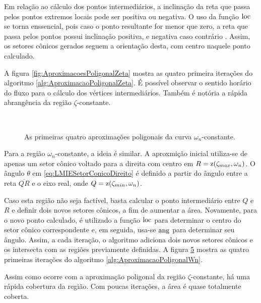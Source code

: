 Em relação ao cálculo dos pontos intermediários, a inclinação da reta que passa pelos pontos extremos locais pode ser positiva ou negativa. O uso da função $\operatorname{loc}$ se torna enssencial, pois caso o ponto resultante for menor que zero, a reta que passa pelos pontos possui inclinação positiva, e negativa caso contrário \cite{WISNIEWSKI2019}. Assim, os setores cônicos gerados seguem a orientação desta, com centro naquele ponto calculado.

A figura \ref{fig:AproximacoesPoligonalZeta} mostra as quatro primeira iterações do algoritmo \ref{alg:AproximacaoPoligonalZeta}. É possível observar o sentido horário do fluxo para o cálculo dos vértices intermediários. Também é notória a rápida abrangência da região $\zeta$-constante.

\begin{figure}[!hb]
  \centering
  \begin{subfigure}[t]{0.4\columnwidth}
      
      \caption{}
      \label{subfig:AproximacaoPoligonalWn1}
  \end{subfigure}
  \begin{subfigure}[t]{0.4\columnwidth}
      
      \caption{}
      \label{subfig:AproximacaoPoligonalWn2}
  \end{subfigure}
  \\
  \begin{subfigure}[t]{0.4\columnwidth}
    
    \caption{}
    \label{subfig:AproximacaoPoligonalWn3}
  \end{subfigure}
  \begin{subfigure}[t]{0.4\columnwidth}
    
    \caption{}
    \label{subfig:AproximacaoPoligonalWn4}
  \end{subfigure}
  \caption{As primeiras quatro aproximações poligonais da curva $\omega_n$-constante.}
  \label{fig:AproximacoesPoligonalWn}
\end{figure}

Para a região $\omega_n$-constante, a ideia é similar. A aproxmição inicial utiliza-se de apenas um setor cônico voltado para a direita com centro em $R = \operatorname{\mathrm{z}}(\zeta_{max},\omega_n)$. O ângulo $\theta$ em \eqref{eq:LMIESetorConicoDireito} é definido a partir do ângulo entre a reta $\overline{QR}$ e o eixo real, onde $Q = \operatorname{\mathrm{z}}(\zeta_{min},\omega_n)$.

Caso esta região não seja factível, basta calcular o ponto intermediário entre $Q$ e $R$ e definir dois novos setores cônicos, a fim de aumentar a área. Novamente, para o novo ponto calculado, é utilizado a função $\operatorname{loc}$ para determinar o centro do setor cônico correspondente e, em seguida, usa-se $\operatorname{ang}$ para determinar seu ângulo. Assim, a cada iteração, o algoritmo adiciona dois novos setores cônicos e os intersecta com as regiões previamente definidas. A figura \ref{fig:AproximacoesPoligonalWn} mostra as quatro primeiras iterações do algoritmo \ref{alg:AproximacaoPoligonalWn}.

Assim como ocorre com a aproximação poligonal da região $\zeta$-constante, há uma rápida cobertura da região. Com poucas iterações, a área é quase totalmente coberta.